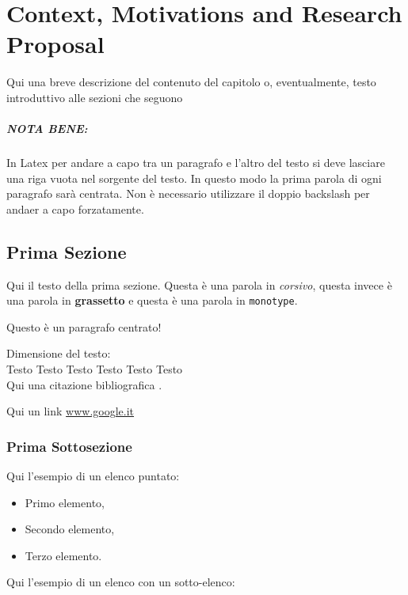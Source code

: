 \chapter{Context, Motivations and Research Proposal}
Qui una breve descrizione del contenuto del capitolo o, eventualmente, testo introduttivo alle sezioni che seguono

\paragraph{NOTA BENE:} In Latex per andare a capo tra un paragrafo e l'altro del testo si deve lasciare una riga vuota nel sorgente del testo. In questo modo la prima parola di ogni paragrafo sarà centrata. Non è necessario utilizzare il doppio backslash per andaer a capo forzatamente.

\section{Prima Sezione}
Qui il testo della prima sezione. Questa è  una parola in \textit{corsivo}, questa invece è una parola in \textbf{grassetto} e questa è una parola in \texttt{monotype}.

\begin{center}
Questo è un paragrafo centrato!
\end{center}

Dimensione del testo:\\

\LARGE{Testo} \Large{Testo} \large{Testo} \normalsize{Testo} \small{Testo} \footnotesize{Testo}\\

Qui una citazione bibliografica \cite{Lingiardi}.

Qui un link \url{www.google.it}


\subsection{Prima Sottosezione}

Qui l'esempio di un elenco puntato:

\begin{itemize}
\item Primo elemento,
\item Secondo elemento,
\item Terzo elemento.
\end{itemize}

Qui l'esempio di un elenco con un sotto-elenco:

